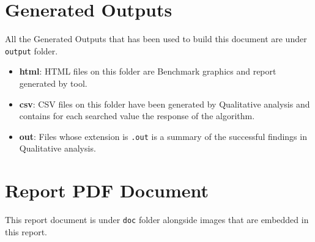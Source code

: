 \documentclass[12pt, a4paper]{article}
\begin{document}
\section{Generated Outputs}\label{apx:reports}
All the Generated Outputs that has been used to build this document are under \texttt{output} folder.

\begin{itemize}
  \item \textbf{html}: HTML files on this folder are Benchmark graphics and report generated by \cite{criterion} tool.
  \item \textbf{csv}: CSV files on this folder have been generated by Qualitative analysis and contains for each searched value the response of the algorithm.
  \item \textbf{out}: Files whose extension is \texttt{.out} is a summary of the successful findings in Qualitative analysis.
\end{itemize}

\section{Report PDF Document}
This report document is under \texttt{doc} folder alongside images that are embedded in this report.
\end{document}
